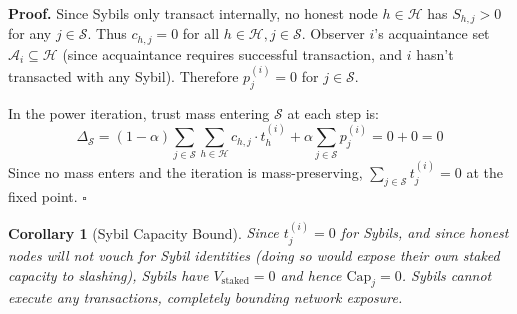 \documentclass[11pt]{article}
\newtheorem{corollary}[theorem]{Corollary}
\newcommand{\qed}{\hfill}
\newenvironment{proof}{\noindent\textbf{Proof.}}{\qed$\square$\par\medskip}
\begin{document}
\begin{proof}
Since Sybils only transact internally, no honest node $h \in \mathcal{H}$ has $S_{h,j} > 0$ for any $j \in \mathcal{S}$. Thus $c_{h,j} = 0$ for all $h \in \mathcal{H}, j \in \mathcal{S}$. Observer $i$'s acquaintance set $\mathcal{A}_i \subseteq \mathcal{H}$ (since acquaintance requires successful transaction, and $i$ hasn't transacted with any Sybil). Therefore $p^{(i)}_j = 0$ for $j \in \mathcal{S}$.

In the power iteration, trust mass entering $\mathcal{S}$ at each step is:
\[
    \Delta_{\mathcal{S}} = (1-\alpha) \sum_{j \in \mathcal{S}} \sum_{h \in \mathcal{H}} c_{h,j} \cdot t^{(i)}_h + \alpha \sum_{j \in \mathcal{S}} p^{(i)}_j = 0 + 0 = 0
\]
Since no mass enters and the iteration is mass-preserving, $\sum_{j \in \mathcal{S}} t^{(i)}_j = 0$ at the fixed point. \qed
\end{proof}

\begin{corollary}[Sybil Capacity Bound]
Since $t^{(i)}_j = 0$ for Sybils, and since honest nodes will not vouch for Sybil identities (doing so would expose their own staked capacity to slashing), Sybils have $V_{\text{staked}} = 0$ and hence $\text{Cap}_j = 0$. Sybils cannot execute any transactions, completely bounding network exposure.
\end{corollary}
\end{document}

